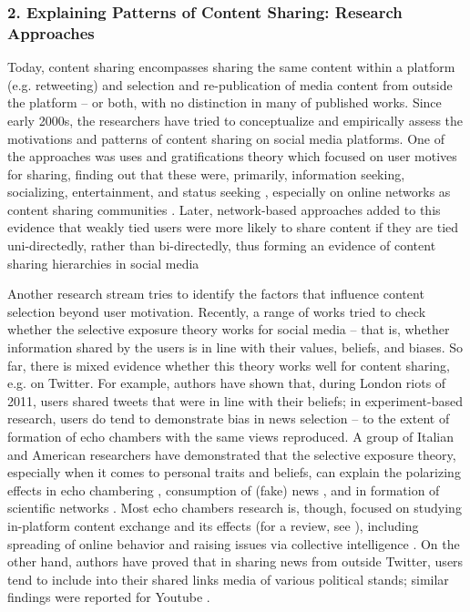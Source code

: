 \subsubsection{2. Explaining Patterns of Content Sharing: Research Approaches}

Today, content sharing encompasses sharing the same content within a platform (e.g. retweeting) and selection and re-publication of media content from outside the platform -- or both, with no distinction in many of published works. Since early 2000s, the researchers have tried to conceptualize and empirically assess the motivations and patterns of content sharing on social media platforms. One of the approaches was uses and gratifications theory which focused on user motives for sharing, finding out that these were, primarily, information seeking, socializing, entertainment, and status seeking  \cite{LeeMa}, especially on online networks as content sharing communities \cite{LeeAntoniadisSalamatian}. Later, network-based approaches added to this evidence that weakly tied users were more likely to share content if they are tied uni-directedly, rather than bi-directedly, thus forming an evidence of content sharing hierarchies in social media \cite{ShiRuiWhinston}

Another research stream tries to identify the factors that influence content selection beyond user motivation. Recently, a range of works tried to check whether the selective exposure theory \cite{SearsPreedman} works for social media -- that is, whether information shared by the users is in line with their values, beliefs, and biases. So far, there is mixed evidence whether this theory works well for content sharing, e.g. on Twitter. For example, authors \cite{ThorsonWells} have shown that, during London riots of 2011, users shared tweets that were in line with their beliefs; in experiment-based research, users do tend to demonstrate bias in news selection \cite{MunsonResnick} -- to the extent of formation of echo chambers \cite{Garett} with the same views reproduced. A group of Italian and American researchers have demonstrated that the selective exposure theory, especially when it comes to personal traits and beliefs, can explain the polarizing effects in echo chambering \cite{QuattrociocchiCaldarelliScala}, consumption of (fake) news \cite{BessiCaldarelliDelVicario}, and in formation of scientific networks \cite{QuattrociocchiAmblardGaleota}. Most echo chambers research is, though, focused on studying in-platform content exchange and its effects (for a review, see \cite{Bessi}), including spreading of online behavior \cite{Centola} and raising issues via collective intelligence \cite{Levy,MaloneKlein}. On the other hand, authors \cite{MorganLampeShafiq} have proved that in sharing news from outside Twitter, users tend to include into their shared links media of various political stands; similar findings were reported for Youtube \cite{HalveyKeane}.

